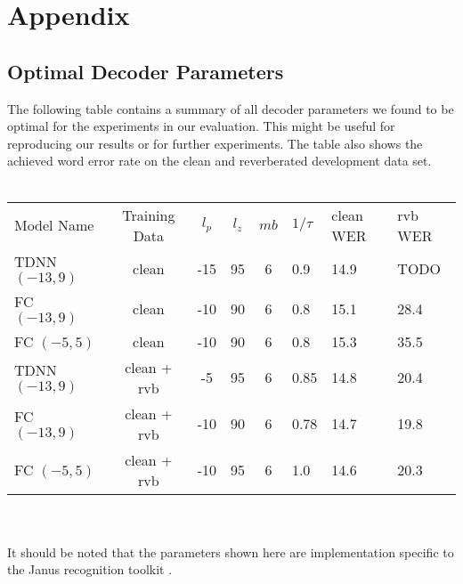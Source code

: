 

\chapter{Appendix}
\label{ch:appendix}
\section{Optimal Decoder Parameters}
The following table contains a summary of all decoder parameters we found to be optimal for the experiments in our evaluation. This might be useful for reproducing our results or for further experiments. The table also shows the achieved word error rate on the clean and reverberated development data set. \\ \\ 
\begin{minipage}{\linewidth}
	\centering
	\begin{tabular}{@{\extracolsep{4pt}}lcccclll@{}}
		\toprule
		Model Name      & Training Data & $l_p$ & $l_z$ & $mb$ &  $1/\tau$ & clean WER & rvb WER \\\cmidrule[1pt]{1-1}\cmidrule[1pt]{2-8}
		TDNN $(-13, 9)$ & clean         & -15   & 95    & 6     & 0.9       & 14.9 & TODO\\
		FC $(-13, 9)$   & clean         & -10   & 90    & 6     & 0.8       & 15.1 & 28.4 \\
		FC $(-5, 5)$    & clean         & -10   & 90    & 6     & 0.8       & 15.3 & 35.5 \\\midrule
		TDNN $(-13, 9)$ & clean + rvb   & -5    & 95    & 6     & 0.85      & 14.8 & 20.4 \\
		FC $(-13, 9)$   & clean + rvb   & -10   & 90    & 6     & 0.78      & 14.7 & 19.8 \\
		FC $(-5, 5)$    & clean + rvb   & -10   & 95    & 6     & 1.0       & 14.6 & 20.3\\
		\bottomrule
	\end{tabular}
	\label{tbl:decoder_params}
\end{minipage} \\ \\
It should be noted that the parameters shown here are implementation specific to the Janus recognition toolkit \cite{finke1997karlsruhe}.